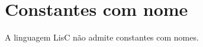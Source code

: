 \documentclass[
  12pt,				%
  oneside,			%
  a4paper,			%
  english,			%
  french,				%
  spanish,			%
  brazil,				%
]{abntex2}
\begin{document}
\section{Constantes com nome}
\label{sec:constantes-com-nome}

A linguagem LisC não admite constantes com nomes.








\postextual


\printindex
\end{document}
